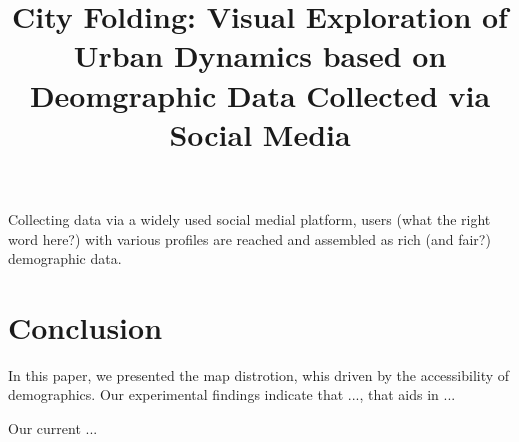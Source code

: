 \documentclass[journal]{vgtc}                %
\title{City Folding: Visual Exploration of Urban Dynamics based on Deomgraphic Data Collected via Social Media}
\begin{document}


\maketitle


Collecting data via a widely used social medial platform, users (what the right word here?) with various profiles are reached and assembled as rich (and fair?) demographic data. 








% 

\section{Conclusion}

In this paper, we presented the map distrotion, whis driven by the accessibility of demographics. Our experimental findings indicate that ..., that aids in ...

Our current ...


 





%

%
%
%


\end{document}

